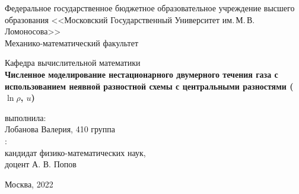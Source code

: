 \begin{titlepage}
	\begin{center}
		Федеральное государственное бюджетное образовательное учреждение высшего образования 
		<<Московский Государственный Университет им.\,М.\,В.\,Ломоносова>>\\

		Механико-математический факультет

		Кафедра вычислительной математики\\[7cm]


		{\bf Численное моделирование нестационарного двумерного течения газа с использованием неявной разностной схемы с центральными разностями ($\ln{\rho}$, $u$)\\[0.5cm]}


		\vspace{6cm}
		\begin{flushright}
			{ выполнила:}\\
			Лобанова Валерия, 410 группа\\[0.5cm]
			{:}\\
			кандидат физико-математических наук,\\
			доцент А. В. Попов\\
		\end{flushright}
		\vspace{5,5cm}

		\normalsize Москва, 2022
	\end{center}
\end{titlepage}
